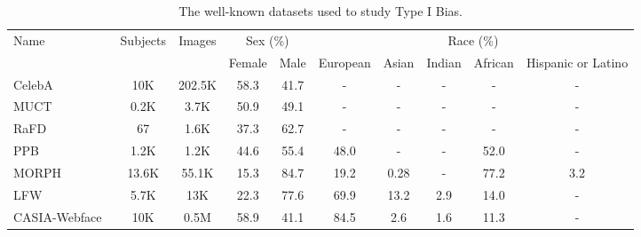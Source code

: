 \begin{table*}[htbp]
\centering
   \caption{The well-known datasets used to study Type I Bias.}
   \label{tab:datasets_I}
\begin{tabular}{lccccccccc}
\toprule
\multirow{2}{*}{Name} & \multirow{2}{*}{Subjects} & \multirow{2}{*}{Images} & \multicolumn{2}{c}{Sex (\%)} & \multicolumn{5}{c}{Race (\%)}                                                                         \\  
\cmidrule(lr){4-5}  \cmidrule(lr){6-10} 
                      &                           &                         & Female           & Male          & European             & Asian            & Indian            & African            & Hispanic or Latino            \\ 
                      \midrule
CelebA~\cite{CelebA}                & 10K                       & 202.5K                  & 58.3             & 41.7          & -                    & -                & -                 & -                  & -                   \\ 
MUCT~\cite{MUCT}                  & 0.2K                      & 3.7K                    & 50.9             & 49.1          & -                    & -                & -                 & -                  & -                   \\ 
RaFD~\cite{RaFD}                  & 67                        & 1.6K                    & 37.3             & 62.7          & -                    & -                & -                 & -                  & -                   \\ 
PPB~\cite{Timnit_sex_classification_PPB}                   & 1.2K                      & 1.2K                    & 44.6             & 55.4          & 48.0                 & -                & -                 & 52.0               & -                   \\ 
MORPH~\cite{MORPH}                 & 13.6K                     & 55.1K                   & 15.3             & 84.7          & 19.2                 & 0.28             & -                 & 77.2               & 3.2                 \\ 
LFW~\cite{LFW}                   & 5.7K                      & 13K                     & 22.3             & 77.6          & 69.9                 & 13.2             & 2.9               & 14.0               & -                   \\ 
CASIA-Webface~\cite{webface}         & 10K                       & 0.5M                    & 58.9             & 41.1          & 84.5                 & 2.6              & 1.6               & 11.3               & -                   \\ 

\end{tabular}
\end{table*}
